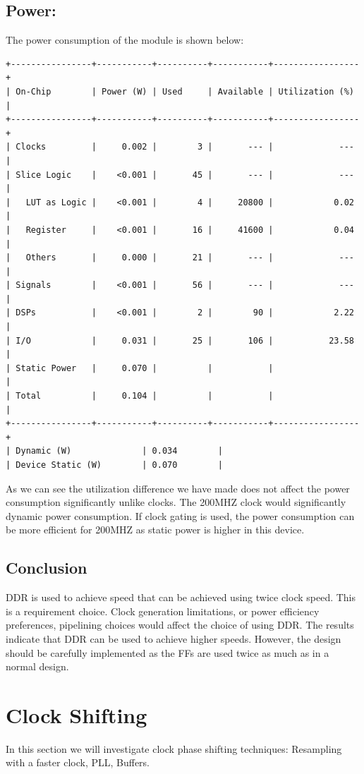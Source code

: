 \documentclass{report}
\begin{document}
\subsection{Power:}
The power consumption of the module is shown below:
\begin{verbatim}
+----------------+-----------+----------+-----------+-----------------+
| On-Chip        | Power (W) | Used     | Available | Utilization (%) |
+----------------+-----------+----------+-----------+-----------------+
| Clocks         |     0.002 |        3 |       --- |             --- |
| Slice Logic    |    <0.001 |       45 |       --- |             --- |
|   LUT as Logic |    <0.001 |        4 |     20800 |            0.02 |
|   Register     |    <0.001 |       16 |     41600 |            0.04 |
|   Others       |     0.000 |       21 |       --- |             --- |
| Signals        |    <0.001 |       56 |       --- |             --- |
| DSPs           |    <0.001 |        2 |        90 |            2.22 |
| I/O            |     0.031 |       25 |       106 |           23.58 |
| Static Power   |     0.070 |          |           |                 |
| Total          |     0.104 |          |           |                 |
+----------------+-----------+----------+-----------+-----------------+
| Dynamic (W)              | 0.034        |
| Device Static (W)        | 0.070        |
\end{verbatim}
As we can see the utilization difference we have made does not affect the power consumption significantly unlike clocks. The 200MHZ clock would significantly dynamic power consumption. If clock gating is used, the power consumption can be more efficient for 200MHZ as static power is higher in this device.
\subsection{Conclusion}
DDR is used to achieve speed that can be achieved using twice clock speed. This is a requirement choice. Clock generation limitations, or power efficiency preferences, pipelining choices would affect the choice of using DDR. The results indicate that DDR can be used to achieve higher speeds. However, the design should be carefully implemented as the FFs are used twice as much as in a normal design.

\section{Clock Shifting}
In this section we will investigate clock phase shifting techniques: Resampling with a faster clock, PLL, Buffers.
\end{document}
